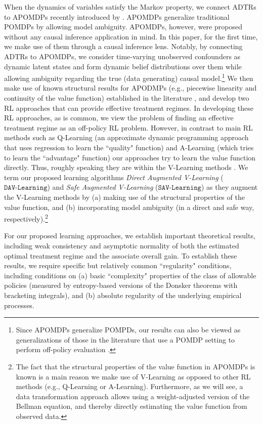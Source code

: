 \documentclass[opre,nonblindrev]{informs2}%
\newcommand{\1}{\hbox{\rm 1\kern-.35em 1}}
\newcommand{\SAV}{\texttt{SAV-Learning}}
\newcommand{\DAV}{\texttt{DAV-Learning}}
\begin{document}
 When the dynamics of  variables satisfy the Markov property, we connect ADTRs to APOMDPs recently introduced by \cite{Saghafian2018}. APOMDPs generalize traditional POMDPs by allowing model ambiguity.   APOMDPs, however, were proposed without any causal inference application in mind.  In this paper, for the first time, we make use of them through a causal inference lens. Notably, by connecting ADTRs to APOMDPs, we consider time-varying unobserved confounders as dynamic latent states and form dynamic belief distributions over them while allowing ambiguity regarding the true (data generating) causal model.\footnote{Since APOMDPs generalize POMPDs,  our results can also be viewed as generalizations of those in the literature that use a POMDP setting to perform off-policy evaluation \citep[see, e.g.,][and the references therein]{Tennenholtz2019, Xu2020, Bennett2021proximal, Hu2021, Thomas2016}.} We then  make use of known structural results for APODMPs (e.g., piecewise linearity and continuity of the value function) established in the literature \citep{Saghafian2018}, and develop two RL approaches that can provide effective treatment regimes. In developing these RL approaches, as is common, we view the problem of finding an effective treatment regime as an off-policy RL problem. However, in contrast to main RL methods such as Q-Learning (an approximate dynamic programming approach that uses regression to learn the ``quality" function)  and A-Learning (which  tries to learn the ``advantage" function) our approaches try to learn the value function directly.  Thus, roughly speaking they are within the V-Learning methods \cite[see, e.g.,][]{Luckett2020, Xu2020}.  We term our proposed learning algorithms {\em Direct Augmented V-Learning} ($\DAV$) and {\em Safe Augmented V-Learning} ($\SAV$) as they augment the V-Learning methods by (a) making use of the structural properties of the value function, and (b) incorporating model ambiguity (in a direct and safe way, respectively).\footnote{The fact that the structural properties of the value function in APOMDPs is known \citep[see][]{Saghafian2018} is  a main reason we make use of V-Learning as opposed to other RL methods (e.g., Q-Learning or A-Learning). Furthermore, as we will see, a data transformation approach allows using a weight-adjusted version of the Bellman equation, and thereby directly estimating the value function from observed data.}


For our proposed learning approaches, we establish important theoretical results, including weak consistency and asymptotic normality of both the estimated optimal treatment regime and the associate overall gain. To establish these results, we require specific but relatively common ``regularity" conditions,  including conditions on (a)  basic ``complexity" properties of the class of allowable policies (measured by entropy-based versions of the Donsker theorems with bracketing integrals), and (b) absolute regularity of the underlying empirical processes.
\end{document}
